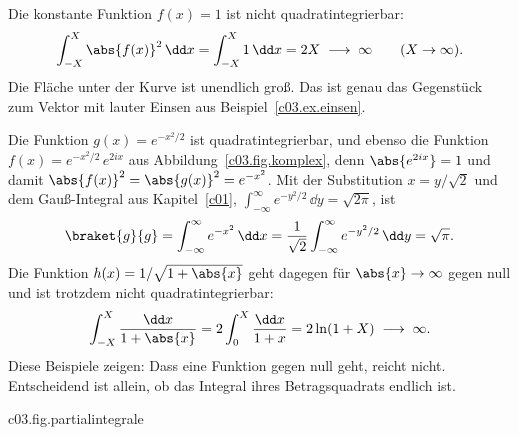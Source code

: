 \begin{vertiefung}
  \begin{example}\label{c03.ex.eins}
    Die konstante Funktion $f(x) = 1$ ist nicht quadratintegrierbar:
    \begin{equation}\label{c03.eq.eins}
      \int_{-X}^{X} \abs{f(x)}^2\, \dd x = \int_{-X}^{X} 1\, \dd x = 2X
      \;\longrightarrow\; \infty
      \qquad (X \to \infty) .
    \end{equation}
    Die Fläche unter der Kurve ist unendlich groß. Das ist genau das Gegenstück zum Vektor
    mit lauter Einsen aus Beispiel~\ref{c03.ex.einsen}.
  \end{example}

  \begin{example}\label{c03.ex.gauss}
    Die Funktion $g(x) = e^{-x^2/2}$ ist quadratintegrierbar, und ebenso die Funktion
    $f(x) = e^{-x^2/2}\, e^{2ix}$ aus Abbildung~\ref{c03.fig.komplex}, denn
    $\abs{e^{2ix}} = 1$ und damit $\abs{f(x)}^2 = \abs{g(x)}^2 = e^{-x^2}$. Mit der
    Substitution $x = y/\sqrt{2}$ und dem Gauß-Integral aus Kapitel~\ref{c01},
    $\int_{-\infty}^{\infty} e^{-y^2/2}\, \dd y = \sqrt{2\pi}$, ist
    \begin{equation}\label{c03.eq.gauss}
      \braket{g}{g} = \int_{-\infty}^{\infty} e^{-x^2}\, \dd x
      = \frac{1}{\sqrt{2}} \int_{-\infty}^{\infty} e^{-y^2/2}\, \dd y
      = \sqrt{\pi} .
    \end{equation}
    Die Funktion $h(x) = 1/\sqrt{1 + \abs{x}}$ geht dagegen für $\abs{x} \to \infty$ gegen
    null und ist trotzdem nicht quadratintegrierbar:
    \begin{equation}\label{c03.eq.log}
      \int_{-X}^{X} \frac{\dd x}{1 + \abs{x}} = 2 \int_{0}^{X} \frac{\dd x}{1 + x}
      = 2 \ln(1 + X) \;\longrightarrow\; \infty .
    \end{equation}
    Diese Beispiele zeigen: Dass eine Funktion gegen null geht, reicht nicht. Entscheidend
    ist allein, ob das Integral ihres Betragsquadrats endlich ist.
  \end{example}

  \begin{tpcfigure}{c03.fig.partialintegrale}
    \caption{Dieselbe Prüfung für Funktionen: das Integral $\int_{-X}^{X} \abs{f(x)}^2\, \dd x$
      als Funktion von $X$. Für $f(x) = e^{-x^2/2}$ (durchgezogen) nähert es sich
      $\sqrt{\pi}$ (dünne Linie, Gleichung~\eqref{c03.eq.gauss}); für
      $f(x) = 1/\sqrt{1 + \abs{x}}$ (gestrichelt) wächst es wie $2\ln(1 + X)$, für $f = 1$
      (strichpunktiert) wie $2X$ (Gleichungen~\eqref{c03.eq.log} und~\eqref{c03.eq.eins}).
      Die Linien zeigen kontinuierlich, was Abbildung~\ref{c03.fig.partialsummen} für den
      diskreten Index $j$ zeigt.}
  \end{tpcfigure}
\end{vertiefung}


